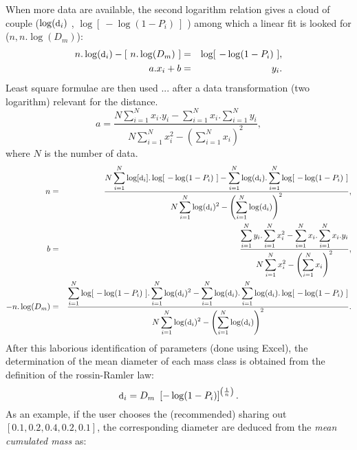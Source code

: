 When more data are available, the second logarithm relation gives a cloud of
couple ($\log(\mbox{\small d}_i)$ , $\log[~-\log(1-P_i)~]$ ) among which a
linear fit is looked for ($n, n.\log(D_m)$):
\begin{eqnarray}
  \displaystyle n . \log(\mbox{\small d}_i)- \left[~n.\log(D_m)~\right] &=& \log[~-\log(1-P_i)~], \label{eq:combustion:log_007}\\
  a.x_i + b &=& y_i. \nonumber
\end{eqnarray}
Least square formulae are then used ... after a data transformation (two
logarithm) relevant for the distance.
\begin{equation}
a = \frac{N \displaystyle \sum_{i=1}^N x_i.y_i - \sum_{i=1}^N x_i . \sum_{i=1}^N y_i}{N \displaystyle \sum_{i=1}^N x_i^2 - \left( \sum_{i=1}^N x_i\right)^2}, \label{eq:combustion:log_008}
\end{equation}
where $N$ is the number of data.
\begin{eqnarray*}
n &=& 
\dfrac{
  N \displaystyle \sum_{i=1}^N \log[\mbox{\small d}_i].\log[~-\log(1-P_i)~] - \sum_{i=1}^N \log(\mbox{\small d}_i) . \sum_{i=1}^N \log[~-\log(1-P_i)~]
}{
  N\displaystyle \sum_{i=1}^N \log(\mbox{\small d}_i)^2 - \left( \sum_{i=1}^N \log(\mbox{\small d}_i)\right)^2
},  \\
b &=& 
\dfrac{ 
  \displaystyle \sum_{i=1}^N y_i . \sum_{i=1}^N x_i^2 - \sum_{i=1}^N x_i . \sum_{i=1}^N x_i.y_i 
}{
  N \displaystyle \sum_{i=1}^N x_i^2 - \left( \sum_{i=1}^N x_i\right)^2
},  \\ 
-n.\log(D_m) &=& 
\dfrac{
  \displaystyle \sum_{i=1}^N \log[~-\log(1-P_i)~] . \sum_{i=1}^N \log(\mbox{\small d}_i)^2 - \sum_{i=1}^N \log(\mbox{\small d}_i) . \sum_{i=1}^N \log(\mbox{\small d}_i).\log[~-\log(1-P_i)~] 
}{
  N \displaystyle \sum_{i=1}^N \log(\mbox{\small d}_i)^2 - \left( \sum_{i=1}^N \log(\mbox{\small d}_i)\right)^2
}.
\end{eqnarray*}
After this laborious identification of parameters (done using Excel), the
determination of the mean diameter of each mass class is obtained from the
definition of the rossin-Ramler law:
\begin{equation}
 \mbox{\small d}_i = D_m ~ \left[-\log(1-P_i) \right]^{\left(\frac{1}{n} \right)}. \label{eq:combustion:log_012}
\end{equation} 
As an example, if the user chooses the (recommended) sharing out $\left[0.1 , 0.2 , 0.4 , 0.2, 0.1 \right]$, the corresponding diameter are deduced from the \textit{mean cumulated mass} as:
